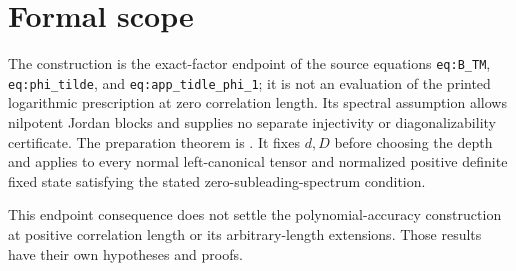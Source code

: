 \documentclass{article}
\begin{document}
\section{Formal scope}

The construction is the exact-factor endpoint of the source equations
\texttt{eq:B\_TM}, \texttt{eq:phi\_tilde}, and
\texttt{eq:app\_tidle\_phi\_1}; it is not an evaluation of the printed
logarithmic prescription at zero correlation length. Its spectral
assumption allows nilpotent Jordan blocks and supplies no separate
injectivity or diagonalizability certificate.
The preparation theorem is
.
It fixes $d,D$ before choosing the depth and applies to every normal
left-canonical tensor and normalized positive definite fixed state
satisfying the stated zero-subleading-spectrum condition.

This endpoint consequence does not settle the polynomial-accuracy
construction at positive correlation length or its arbitrary-length
extensions. Those results have their own hypotheses and proofs.



\end{document}
